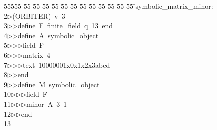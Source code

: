 %
%
\begin{tabbing}
55555 \= 55 \= 55 \= 55 \= 55 \= 55 \= 55 \= 55 \= 55 \= 55 \= 55 \= 55 \= 55 \= \>symbolic\_matrix\_minor:\\[0pt]
2\>$\triangleright$\>(ORBITER)\ v\ 3\ \\[0pt]
3\>$\triangleright$\>$\triangleright$\>define\ F\ finite\_field\ q\ 13\ end\ \\[0pt]
4\>$\triangleright$\>$\triangleright$\>define\ A\ symbolic\_object\ \\[0pt]
5\>$\triangleright$\>$\triangleright$\>$\triangleright$\>field\ F\ \\[0pt]
6\>$\triangleright$\>$\triangleright$\>$\triangleright$\>matrix\ 4\ \\[0pt]
7\>$\triangleright$\>$\triangleright$\>$\triangleright$\>text\ 10000001x0x1x2x3abcd\ \\[0pt]
8\>$\triangleright$\>$\triangleright$\>end\ \\[0pt]
9\>$\triangleright$\>$\triangleright$\>define\ M\ symbolic\_object\ \\[0pt]
10\>$\triangleright$\>$\triangleright$\>$\triangleright$\>field\ F\ \\[0pt]
11\>$\triangleright$\>$\triangleright$\>$\triangleright$\>minor\ A\ 3\ 1\ \ \\[0pt]
12\>$\triangleright$\>$\triangleright$\>end\\[0pt]
13\>\end{tabbing}
